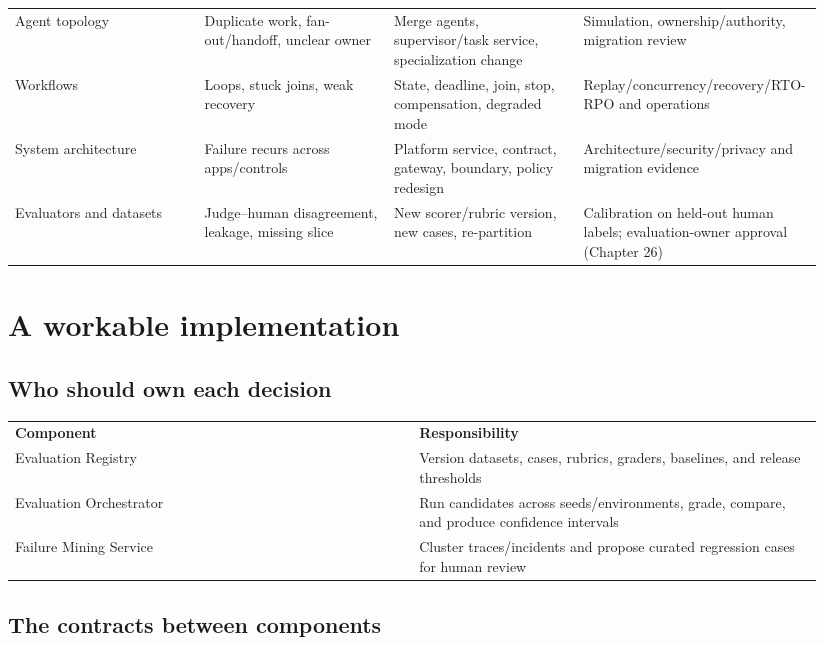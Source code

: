 \begin{longtable}{@{}Y{0.2350\linewidth}Y{0.2350\linewidth}Y{0.2350\linewidth}Y{0.2350\linewidth}@{}}
Agent topology & Duplicate work, fan-out/handoff, unclear owner & Merge agents, supervisor/task service, specialization change & Simulation, ownership/authority, migration review \\
Workflows & Loops, stuck joins, weak recovery & State, deadline, join, stop, compensation, degraded mode & Replay/concurrency/recovery/RTO-RPO and operations \\
System architecture & Failure recurs across apps/controls & Platform service, contract, gateway, boundary, policy redesign & Architecture/security/privacy and migration evidence \\
Evaluators and datasets & Judge–human disagreement, leakage, missing slice & New scorer/rubric version, new cases, re-partition & Calibration on held-out human labels; evaluation-owner approval (Chapter 26) \\
\end{longtable}
\BookTableEnd

\section{A workable implementation}

\subsection{Who should own each decision}

\BookTableStart
\small
\begin{tabular}{@{}Y{0.4700\linewidth}Y{0.4700\linewidth}@{}}
\color{white}\bfseries \textbf{Component} & \color{white}\bfseries \textbf{Responsibility} \\
Evaluation Registry & Version datasets, cases, rubrics, graders, baselines, and release thresholds \\
Evaluation Orchestrator & Run candidates across seeds/environments, grade, compare, and produce confidence intervals \\
Failure Mining Service & Cluster traces/incidents and propose curated regression cases for human review \\
\end{tabular}
\BookTableEnd

\subsection{The contracts between components}

